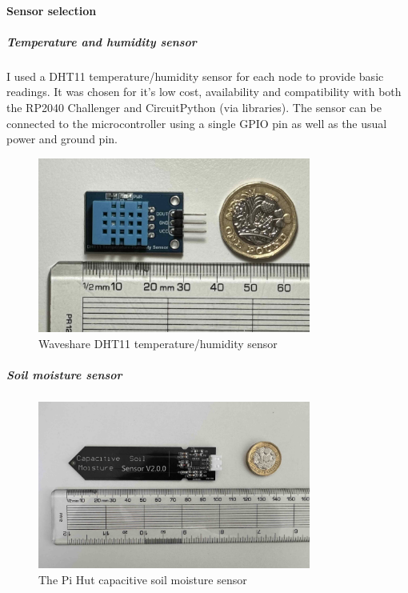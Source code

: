 \paragraph{Sensor selection}

\subparagraph{Temperature and humidity sensor}

I used a DHT11 temperature/humidity sensor for each node to provide basic
readings. It was chosen for it's low cost, availability and compatibility with
both the RP2040 Challenger and CircuitPython (via libraries). The sensor can be
connected to the microcontroller using a single GPIO pin as well as the usual
power and ground pin.

\begin{figure}[H]
    \centering
    \includegraphics[width=0.8\textwidth]{contents/22-hw-design/22-fig/dht11.jpg}
    \caption{Waveshare DHT11 temperature/humidity sensor}
    \label{fig:dht11}
\end{figure}

\subparagraph{Soil moisture sensor}

\begin{figure}[H]
    \centering
    \includegraphics[width=0.8\textwidth]{contents/22-hw-design/22-fig/soil-sensor.jpg}
    \caption{The Pi Hut capacitive soil moisture sensor}
    \label{fig:soil-sensor}
\end{figure}

